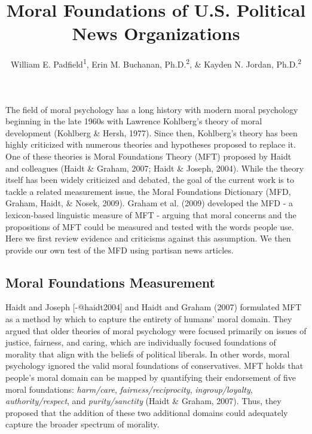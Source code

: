\documentclass[
  man,floatsintext]{apa6}
\title{Moral Foundations of U.S. Political News Organizations}
\author{William E. Padfield\textsuperscript{1}, Erin M. Buchanan, Ph.D.\textsuperscript{2}, \& Kayden N. Jordan, Ph.D.\textsuperscript{2}}
\date{}
\affiliation{\vspace{0.5cm}\textsuperscript{1} Missouri State University\\\textsuperscript{2} Harrisburg University of Science and Technology}
\begin{document}
\maketitle

The field of moral psychology has a long history with modern moral
psychology beginning in the late 1960s with Lawrence Kohlberg's theory
of moral development (Kohlberg \& Hersh, 1977). Since then, Kohlberg's theory has
been highly criticized with numerous theories and hypotheses proposed to
replace it. One of these theories is Moral Foundations Theory (MFT)
proposed by Haidt and colleagues (Haidt \& Graham, 2007; Haidt \& Joseph, 2004). While the
theory itself has been widely criticized and debated, the goal of the
current work is to tackle a related measurement issue, the Moral
Foundations Dictionary (MFD, Graham, Haidt, \& Nosek, 2009). Graham et al. (2009) developed the
MFD - a lexicon-based linguistic measure of MFT - arguing that moral
concerns and the propositions of MFT could be measured and tested with
the words people use. Here we first review evidence and criticisms
against this assumption. We then provide our own test of the MFD using
partisan news articles.

\subsection{Moral Foundations Measurement}\label{moral-foundations-measurement}

Haidt and Joseph {[}-@haidt2004{]} and Haidt and Graham (2007)
formulated MFT as a method by which to capture the entirety of humans'
moral domain. They argued that older theories of moral psychology were
focused primarily on issues of justice, fairness, and caring, which are
individually focused foundations of morality that align with the beliefs
of political liberals. In other words, moral psychology ignored the
valid moral foundations of conservatives. MFT holds that people's moral
domain can be mapped by quantifying their endorsement of five moral
foundations: \emph{harm/care}, \emph{fairness/reciprocity}, \emph{ingroup/loyalty},
\emph{authority/respect}, and \emph{purity/sanctity} (Haidt \& Graham, 2007). Thus, they
proposed that the addition of these two additional domains could
adequately capture the broader spectrum of morality.
\end{document}

